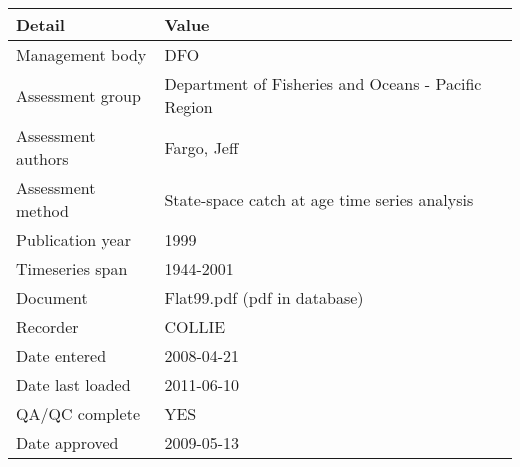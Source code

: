 \begin{table}[htb]
\centering
\begin{tabular}{lp{7cm}}
\toprule
Detail & Value \\
\midrule
Management body    & DFO                                                 \\
Assessment group   & Department of Fisheries and Oceans - Pacific Region \\
Assessment authors & Fargo, Jeff                                         \\
Assessment method  & State-space catch at age time series analysis       \\
Publication year   & 1999                                                \\
Timeseries span    & 1944-2001                                           \\
Document           & Flat99.pdf (pdf in database)                        \\
Recorder           & COLLIE                                              \\
Date entered       & 2008-04-21                                          \\
Date last loaded   & 2011-06-10                                          \\
QA/QC complete     & YES                                                 \\
Date approved      & 2009-05-13                                          \\
\bottomrule
\end{tabular}
\label{tab:assessdet}
\end{table}
